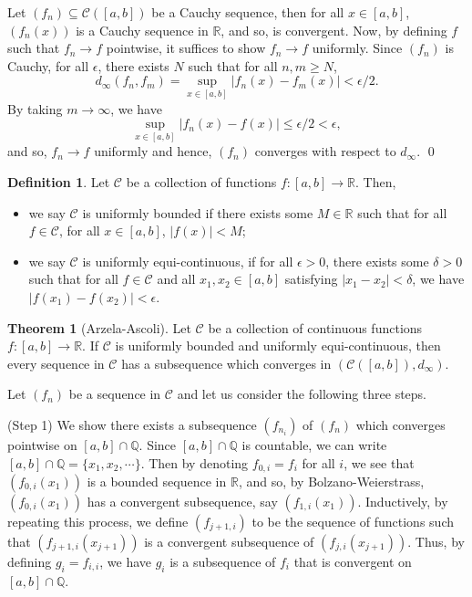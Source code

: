 \documentclass[
]{article}
\theoremstyle{definition}
\newtheorem{theorem}{Theorem}
\theoremstyle{definition}
\newtheorem{definition}{Definition}[section]
\begin{document}
Let \((f_n) \subseteq \mathcal{C}([a, b])\) be a Cauchy sequence, then
for all \(x \in [a, b]\), \((f_n(x))\) is a Cauchy sequence in
\(\mathbb{R}\), and so, is convergent. Now, by defining \(f\) such that
\(f_n \to f\) pointwise, it suffices to show \(f_n \to f\) uniformly.
Since \((f_n)\) is Cauchy, for all \(\epsilon\), there exists \(N\) such
that for all \(n, m \ge N\),
\[d_\infty(f_n, f_m) = \sup_{x \in [a, b]} \left| f_n(x) - f_m(x) \right| < \epsilon / 2.\]
By taking \(m \to \infty\), we have
\[\sup_{x \in [a, b]} \left| f_n(x) - f(x) \right| \le \epsilon / 2 < \epsilon,\]
and so, \(f_n \to f\) uniformly and hence, \((f_n)\) converges with
respect to \(d_\infty\). \qed

\begin{definition}
  Let \(\mathcal{C}\) be a collection of functions \(f : [a, b] \to \mathbb{R}\). 
  Then, 
  \begin{itemize}
    \item we say \(\mathcal{C}\) is uniformly bounded if there exists some 
      \(M \in \mathbb{R}\) such that for all \(f \in \mathcal{C}\), for all 
      \(x \in [a, b]\), \(\left| f(x) \right| < M\);
    \item we say \(\mathcal{C}\) is uniformly equi-continuous, if for all 
      \(\epsilon > 0\), there exists some \(\delta > 0\) such that for all 
      \(f \in \mathcal{C}\) and all \(x_1, x_2 \in [a, b]\) satisfying 
      \(\left| x_1 - x_2 \right| < \delta\), we have 
      \(\left| f(x_1) - f(x_2) \right| < \epsilon\).
  \end{itemize}
\end{definition}

\begin{theorem}[Arzela-Ascoli]
  Let \(\mathcal{C}\) be a collection of continuous functions 
  \(f : [a, b] \to \mathbb{R}\). If \(\mathcal{C}\) is uniformly bounded and 
  uniformly equi-continuous, then every sequence in \(\mathcal{C}\) has a 
  subsequence which converges in \((\mathcal{C}([a, b]), d_\infty)\).
\end{theorem}
\proof

Let \((f_n)\) be a sequence in \(\mathcal{C}\) and let us consider the
following three steps.

(Step 1) We show there exists a subsequence \((f_{n_i})\) of \((f_n)\)
which converges pointwise on \([a, b] \cap \mathbb{Q}\). Since
\([a, b] \cap \mathbb{Q}\) is countable, we can write
\([a, b] \cap \mathbb{Q} = \{x_1, x_2, \cdots\}\). Then by denoting
\(f_{0, i} = f_i\) for all \(i\), we see that \((f_{0, i}(x_1))\) is a
bounded sequence in \(\mathbb{R}\), and so, by Bolzano-Weierstrass,
\((f_{0, i}(x_1))\) has a convergent subsequence, say
\((f_{1, i}(x_1))\). Inductively, by repeating this process, we define
\((f_{j + 1, i})\) to be the sequence of functions such that
\((f_{j + 1, i}(x_{j + 1}))\) is a convergent subsequence of
\((f_{j, i}(x_{j + 1}))\). Thus, by defining \(g_i = f_{i, i}\), we have
\(g_i\) is a subsequence of \(f_i\) that is convergent on
\([a, b] \cap \mathbb{Q}\).
\end{document}
